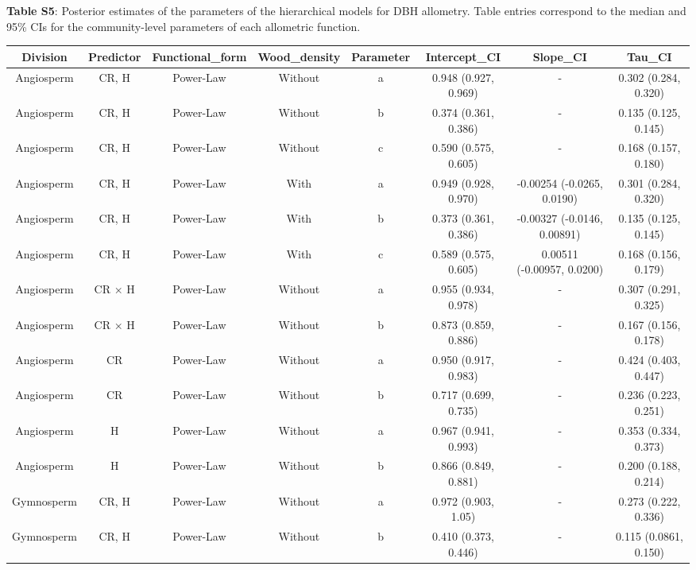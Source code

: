 \documentclass[
  12pt,
  letterpaper,
  DIV=11,
  numbers=noendperiod]{scrartcl}
\begin{document}
\newpage

\textbf{Table S5}: Posterior estimates of the parameters of the
hierarchical models for DBH allometry. Table entries correspond to the
median and 95\% CIs for the community-level parameters of each
allometric function.

\begingroup\fontsize{10}{12}\selectfont

\begin{longtable*}[t]{cccccccc}
\toprule
Division & Predictor & Functional\_form & Wood\_density & Parameter & Intercept\_CI & Slope\_CI & Tau\_CI\\
\midrule
Angiosperm & CR, H & Power-Law & Without & a & 0.948 (0.927, 0.969) & - & 0.302 (0.284, 0.320)\\
Angiosperm & CR, H & Power-Law & Without & b & 0.374 (0.361, 0.386) & - & 0.135 (0.125, 0.145)\\
Angiosperm & CR, H & Power-Law & Without & c & 0.590 (0.575, 0.605) & - & 0.168 (0.157, 0.180)\\
Angiosperm & CR, H & Power-Law & With & a & 0.949 (0.928, 0.970) & -0.00254 (-0.0265, 0.0190) & 0.301 (0.284, 0.320)\\
Angiosperm & CR, H & Power-Law & With & b & 0.373 (0.361, 0.386) & -0.00327 (-0.0146, 0.00891) & 0.135 (0.125, 0.145)\\
\addlinespace
Angiosperm & CR, H & Power-Law & With & c & 0.589 (0.575, 0.605) & 0.00511 (-0.00957, 0.0200) & 0.168 (0.156, 0.179)\\
Angiosperm & CR × H & Power-Law & Without & a & 0.955 (0.934, 0.978) & - & 0.307 (0.291, 0.325)\\
Angiosperm & CR × H & Power-Law & Without & b & 0.873 (0.859, 0.886) & - & 0.167 (0.156, 0.178)\\
Angiosperm & CR & Power-Law & Without & a & 0.950 (0.917, 0.983) & - & 0.424 (0.403, 0.447)\\
Angiosperm & CR & Power-Law & Without & b & 0.717 (0.699, 0.735) & - & 0.236 (0.223, 0.251)\\
\addlinespace
Angiosperm & H & Power-Law & Without & a & 0.967 (0.941, 0.993) & - & 0.353 (0.334, 0.373)\\
Angiosperm & H & Power-Law & Without & b & 0.866 (0.849, 0.881) & - & 0.200 (0.188, 0.214)\\
Gymnosperm & CR, H & Power-Law & Without & a & 0.972 (0.903, 1.05) & - & 0.273 (0.222, 0.336)\\
Gymnosperm & CR, H & Power-Law & Without & b & 0.410 (0.373, 0.446) & - & 0.115 (0.0861, 0.150)\\

\end{longtable*}
\end{document}
